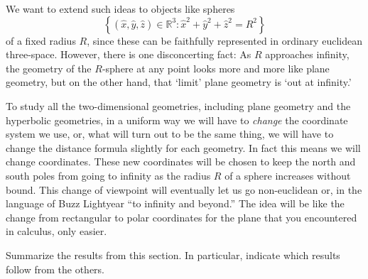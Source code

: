 \documentclass{ximera}
\begin{document}
We want to extend such ideas to objects like spheres
\[
\left\{  \left(  \hat{x},\hat{y},\hat{z}\right)  \in\mathbb{R}^{3}:\hat{x}%
^{2}+\hat{y}^{2}+\hat{z}^{2}=R^{2}\right\}
\]
of a fixed radius $R$, since these can be faithfully represented in
ordinary euclidean three-space.  However, there is one disconcerting
fact: As $R$ approaches infinity, the geometry of the $R$-sphere at
any point looks more and more like plane geometry, but on the other
hand, that `limit' plane geometry is `out at infinity.' 

To study all the two-dimensional geometries, including plane geometry
and the hyperbolic geometries, in a uniform way we will have to
\textit{change} the coordinate system we use, or, what will turn out
to be the same thing, we will have to change the distance formula
slightly for each geometry. In fact this means we will change
coordinates.  These new coordinates will be chosen to keep the north
and south poles from going to infinity as the radius $R$ of a sphere
increases without bound. This change of viewpoint will eventually let
us go non-euclidean or, in the language of Buzz Lightyear ``to
infinity and beyond.'' The idea will be like the change from
rectangular to polar coordinates for the plane that you encountered in
calculus, only easier.


\begin{problem}
Summarize the results from this section. In particular, indicate which
results follow from the others.
\begin{freeResponse}
\end{freeResponse}
\end{problem}
\end{document}
